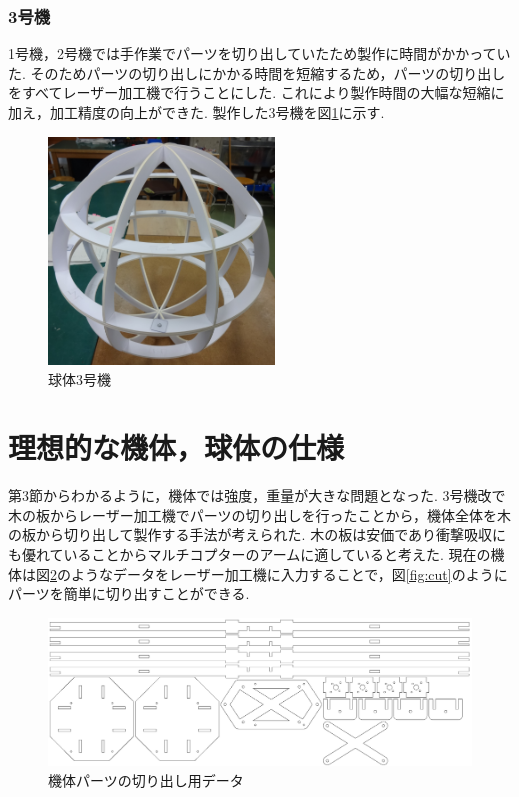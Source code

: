 \documentclass[12pt,oneside]{sotsuken_paper}
\begin{document}
\subsubsection{3号機}
1号機，2号機では手作業でパーツを切り出していたため製作に時間がかかっていた.
そのためパーツの切り出しにかかる時間を短縮するため，パーツの切り出しをすべてレーザー加工機で行うことにした.
これにより製作時間の大幅な短縮に加え，加工精度の向上ができた.
製作した3号機を図\ref{fig:sphere-3}に示す.

\begin{figure}[htbp]
	\begin{center}
		\includegraphics[width=60mm]{image/sphere/sphere-3.jpg}
		\caption{球体3号機}
		\label{fig:sphere-3}
	\end{center}
\end{figure}

\section{理想的な機体，球体の仕様}
第3節からわかるように，機体では強度，重量が大きな問題となった.
3号機改で木の板からレーザー加工機でパーツの切り出しを行ったことから，機体全体を木の板から切り出して製作する手法が考えられた.
木の板は安価であり衝撃吸収にも優れていることからマルチコプターのアームに適していると考えた.
現在の機体は図\ref{fig:CD-data}のようなデータをレーザー加工機に入力することで，図\ref{fig:cut}のようにパーツを簡単に切り出すことができる.

\begin{figure}[htbp]
	\begin{center}
		\includegraphics[width=120mm]{image/drone/CD-data.jpg}
		\caption{機体パーツの切り出し用データ}
		\label{fig:CD-data}
	\end{center}
\end{figure}
\end{document}
